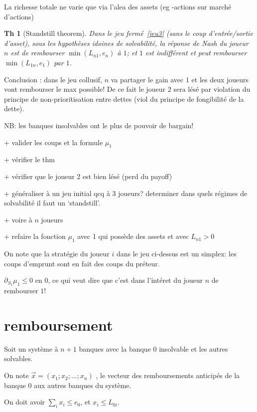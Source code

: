\documentclass[11pt,oneside,twocolumn]{article}
\newtheorem{theorem}{Th}
\begin{document}
La richesse totale ne varie que via l'alea des assets (eg -actions sur marché d'actions)

\begin{theorem}[Standstill theorem]
Dans le jeu fermé~\ref{jeu3} (sans le coup d'entrée/sortie d'asset),
sous les hypothèses idoines de solvabilité, 
la réponse de Nash du joueur $n$ est de
rembourser $\min(L_{n1},e_n)$ à $1$;
et $1$ est indifférent et peut rembourser $\min(L_{1n},e_1)$ par $1$.
\end{theorem}

Conclusion : dans le jeu collusif,
$n$ va partager le gain avec $1$ et les deux joueurs vont rembourser le max possible! De ce fait le joueur $2$ sera lésé 
par violation du principe de non-prioritisation entre dettes
(viol du principe de fongibilité de la dette).

NB: les banques insolvables ont le plus de pouvoir de bargain!

+ valider les coups et la formule $\mu_1$

+ vérifier le thm

+ vérifier que le joueur 2 est bien lésé (perd du payoff)

+ généraliser à un jeu initial qcq à 3 joueurs? determiner dans quels régimes de solvabilité il faut un `standstill'.

+ voire à $n$ joueurs

+ refaire la fonction $\mu_1$ avec 1 qui possède des assets et avec $L_{n1} >0$

On note que la stratégie du joueur $i$ dans le jeu ci-dessus est un simplex:
les coups d'emprunt sont en fait des coups du préteur.

$\partial_{S_1}\mu_1\leq 0$ en $0$,
ce qui veut dire que c'est dans l'intéret du joueur $n$ de rembourser $1$!


\section{remboursement}
Soit un système à $n+1$ banques avec la banque $0$ insolvable et les autres solvables. 

On note 
$ \vec{x} = (x_1 ; x_2; ... ; x_n)$ , le vecteur des remboursements anticipés de la banque 0 aux autres banques du système. 

On doit avoir $\sum_i x_i \leq e_0$, 
et $x_i\leq L_{0i}$.
\end{document}
